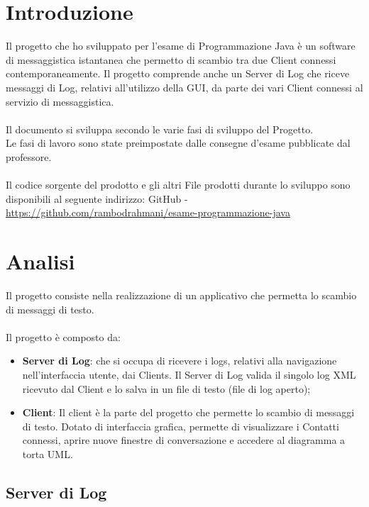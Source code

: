\documentclass[a4paper, 11pt]{article} %
\begin{document}
\newpage
\section{Introduzione}

Il progetto che ho sviluppato per l'esame di Programmazione Java \`e un software di messaggistica istantanea che permetto di scambio tra due Client connessi contemporaneamente. Il progetto comprende anche un Server di Log che riceve messaggi di Log, relativi all'utilizzo della GUI, da parte dei vari Client connessi al servizio di messaggistica.\\
\\
Il documento si sviluppa secondo le varie fasi di sviluppo del Progetto.\\
Le fasi di lavoro sono state preimpostate dalle consegne d'esame pubblicate dal professore.\\
\\
Il codice sorgente del prodotto e gli altri File prodotti durante lo sviluppo sono disponibili al seguente indirizzo: GitHub - \textcolor{blue}{\url{https://github.com/rambodrahmani/esame-programmazione-java}}


\newpage
\section{Analisi}

Il progetto consiste nella realizzazione di un applicativo che permetta lo scambio di messaggi di testo.\\
\\
Il progetto \`e composto da:
\begin{itemize}
\item \textbf{Server di Log}: che si occupa di ricevere i logs, relativi alla navigazione nell'interfaccia utente, dai Clients. Il Server di Log valida il singolo log XML ricevuto dal Client e lo salva in un file di testo (file di log aperto);
\item \textbf{Client}: Il client \`e la parte del progetto che permette lo scambio di messaggi di testo. Dotato di interfaccia grafica, permette di visualizzare i Contatti connessi, aprire nuove finestre di conversazione e accedere al diagramma a torta UML.
\end{itemize}

\subsection{Server di Log}
\end{document}
